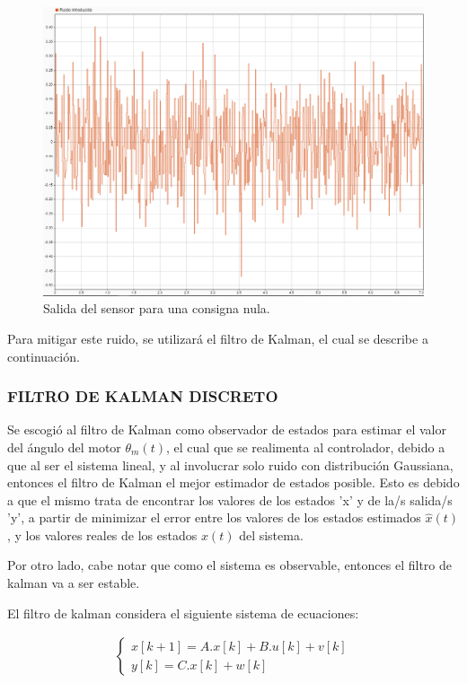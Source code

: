 \documentclass{article}
\begin{document}
\begin{sloppypar}
\begin{figure}[H]
    \centering
    \includegraphics[width=1\textwidth]{Salida del sensor para una consigna nula}
    \caption{Salida del sensor para una consigna nula.}
    \label{fig:Salida del sensor para una consigna nula}
\end{figure}

Para mitigar este ruido, se utilizará el filtro de Kalman, el cual se describe a continuación.


\subsubsection{FILTRO DE KALMAN DISCRETO}
\label{sec:FILTRO DE KALMAN DISCRETO}

Se escogió al filtro de Kalman como observador de estados para estimar el valor del ángulo del motor $\theta_m(t)$, el cual que se realimenta al controlador, debido a que al ser el sistema lineal, y al involucrar solo ruido con distribución Gaussiana, entonces el filtro de Kalman el mejor estimador de estados posible. Esto es debido a que el mismo trata de
encontrar los valores de los estados 'x' y de la/s salida/s 'y', a partir de minimizar el error entre los valores de los estados estimados $\hat{x}(t)$, y los valores reales de los estados $x(t)$ del sistema.

Por otro lado, cabe notar que como el sistema es observable, entonces el filtro de kalman va a ser estable.

El filtro de kalman considera el siguiente sistema de ecuaciones:

\begin{align} \label{eq:sistema de ecuaciones Del filtro de Kalman}
    \begin{cases}
        x[k+1]=A.x[k]+B.u[k]+v[k]
        \\
        y[k]=C.x[k]+w[k]
    \end{cases}
\end{align}


\end{sloppypar}
\end{document}
